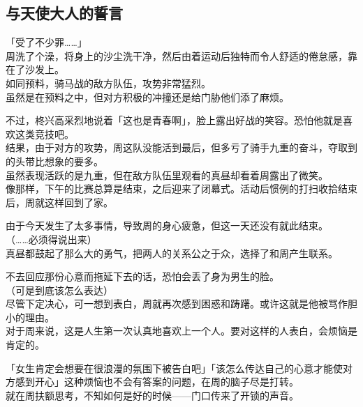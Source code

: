\subsection{与天使大人的誓言}

「受了不少罪……」\\

周洗了个澡，将身上的沙尘洗干净，然后由着运动后独特而令人舒适的倦怠感，靠在了沙发上。\\

如同预料，骑马战的敌方队伍，攻势非常猛烈。\\

虽然是在预料之中，但对方积极的冲撞还是给门胁他们添了麻烦。

不过，柊兴高采烈地说着「这也是青春啊」，脸上露出好战的笑容。恐怕他就是喜欢这类竞技吧。\\

结果，由于对方的攻势，周这队没能活到最后，但多亏了骑手九重的奋斗，夺取到的头带比想象的要多。\\

虽然表现活跃的是九重，但在敌方队伍里观看的真昼却看着周露出了微笑。\\

像那样，下午的比赛总算是结束，之后迎来了闭幕式。活动后惯例的打扫收拾结束后，周就这样回到了家。

由于今天发生了太多事情，导致周的身心疲惫，但这一天还没有就此结束。\\

（……必须得说出来）\\

真昼都鼓起了那么大的勇气，把两人的关系公之于众，选择了和周产生联系。

不去回应那份心意而拖延下去的话，恐怕会丢了身为男生的脸。\\

（可是到底该怎么表达）\\

尽管下定决心，可一想到表白，周就再次感到困惑和踌躇。或许这就是他被骂作胆小的理由。\\

对于周来说，这是人生第一次认真地喜欢上一个人。要对这样的人表白，会烦恼是肯定的。

「女生肯定会想要在很浪漫的氛围下被告白吧」「该怎么传达自己的心意才能使对方感到开心」这种烦恼也不会有答案的问题，在周的脑子尽是打转。\\

就在周扶额思考，不知如何是好的时候——门口传来了开锁的声音。\\

